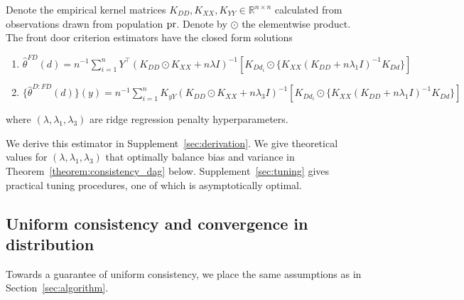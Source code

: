 \begin{algorithm}\label{algorithm:dag}
Denote the empirical kernel matrices
$
K_{DD}, K_{XX}, K_{YY}\in\mathbb{R}^{n\times n}
$
calculated from observations drawn from population $\text{\normalfont pr}$. Denote by $\odot$ the elementwise product. The front door criterion estimators have the closed form solutions
\begin{enumerate}
    \item $
\hat{\theta}^{FD}(d)=n^{-1}\sum_{i=1}^n Y^{\top}(K_{DD}\odot K_{XX}+n\lambda  I )^{-1}[K_{Dd_i}\odot \{K_{XX}(K_{DD}+n\lambda_1  I )^{-1}K_{Dd}\}]
$
    \item $
\{\hat{\theta}^{D:FD}(d)\}(y)=n^{-1}\sum_{i=1}^n K_{yY}(K_{DD}\odot K_{XX}+n\lambda_3  I )^{-1}[K_{Dd_i}\odot \{K_{XX}(K_{DD}+n\lambda_1  I )^{-1}K_{Dd}\}]    
$
\end{enumerate}
where $(\lambda,\lambda_1,\lambda_3)$ are ridge regression penalty hyperparameters.
\end{algorithm}
We derive this estimator in Supplement~\ref{sec:derivation}. We give theoretical values for $(\lambda,\lambda_1,\lambda_3)$ that optimally balance bias and variance in Theorem~\ref{theorem:consistency_dag} below. Supplement~\ref{sec:tuning} gives practical tuning procedures, one of which is asymptotically optimal.

\subsection{Uniform consistency and convergence in distribution}

Towards a guarantee of uniform consistency, we place the same assumptions as in Section~\ref{sec:algorithm}.


